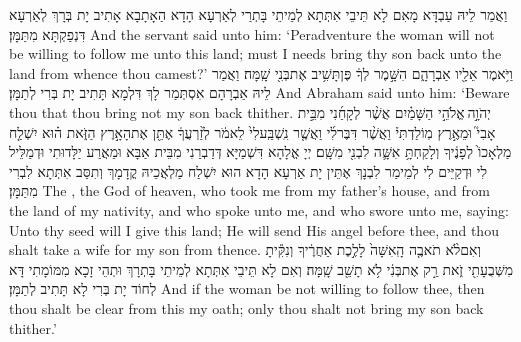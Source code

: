 {וַאֲמַר לֵיהּ עַבְדָּא מָאִם לָא תֵּיבֵי אִתְּתָא לְמֵיתֵי בָּתְרַי לְאַרְעָא הָדָא הַאָתָבָא אָתִיב יָת בְּרָךְ לְאַרְעָא דִּנְפַקְתָּא מִתַּמָּן׃}
{And the servant said unto him: ‘Peradventure the woman will not be willing to follow me unto this land; must I needs bring thy son back unto the land from whence thou camest?’}{}
{וַיֹּ֥אמֶר אֵלָ֖יו אַבְרָהָ֑ם הִשָּׁ֣מֶר לְךָ֔ פֶּן\maqqaf תָּשִׁ֥יב אֶת\maqqaf בְּנִ֖י שָֽׁמָּה׃}
{וַאֲמַר לֵיהּ אַבְרָהָם אִסְתְּמַר לָךְ דִּלְמָא תָּתִיב יָת בְּרִי לְתַמָּן׃}
{And Abraham said unto him: ‘Beware thou that thou bring not my son back thither.}{}
{יְהֹוָ֣ה \legarmeh  אֱלֹהֵ֣י הַשָּׁמַ֗יִם אֲשֶׁ֨ר לְקָחַ֜נִי מִבֵּ֣ית אָבִי֮ וּמֵאֶ֣רֶץ מֽוֹלַדְתִּי֒ וַאֲשֶׁ֨ר דִּבֶּר\maqqaf לִ֜י וַאֲשֶׁ֤ר נִֽשְׁבַּֽע\maqqaf לִי֙ לֵאמֹ֔ר לְזַ֨רְעֲךָ֔ אֶתֵּ֖ן אֶת\maqqaf הָאָ֣רֶץ הַזֹּ֑את ה֗וּא יִשְׁלַ֤ח מַלְאָכוֹ֙ לְפָנֶ֔יךָ וְלָקַחְתָּ֥ אִשָּׁ֛ה לִבְנִ֖י מִשָּֽׁם׃}
{יְיָ אֱלָהָא דִּשְׁמַיָּא דְּדַבְרַנִי מִבֵּית אַבָּא וּמֵאֲרַע יַלָּדוּתִי וּדְמַלֵּיל לִי וּדְקַיֵּים לִי לְמֵימַר לִבְנָךְ אֶתֵּין יָת אַרְעָא הָדָא הוּא יִשְׁלַח מַלְאֲכֵיהּ קֳדָמָךְ וְתִסַּב אִתְּתָא לִבְרִי מִתַּמָּן׃}
{The \lord, the God of heaven, who took me from my father’s house, and from the land of my nativity, and who spoke unto me, and who swore unto me, saying: Unto thy seed will I give this land; He will send His angel before thee, and thou shalt take a wife for my son from thence.}{}
{וְאִם\maqqaf לֹ֨א תֹאבֶ֤ה הָֽאִשָּׁה֙ לָלֶ֣כֶת אַחֲרֶ֔יךָ וְנִקִּ֕יתָ מִשְּׁבֻעָתִ֖י זֹ֑את רַ֣ק אֶת\maqqaf בְּנִ֔י לֹ֥א תָשֵׁ֖ב שָֽׁמָּה׃}
{וְאִם לָא תֵּיבֵי אִתְּתָא לְמֵיתֵי בָּתְרָךְ וּתְהֵי זָכָא מִמּוֹמָתִי דָּא לְחוֹד יָת בְּרִי לָא תָּתִיב לְתַמָּן׃}
{And if the woman be not willing to follow thee, then thou shalt be clear from this my oath; only thou shalt not bring my son back thither.’}{}
